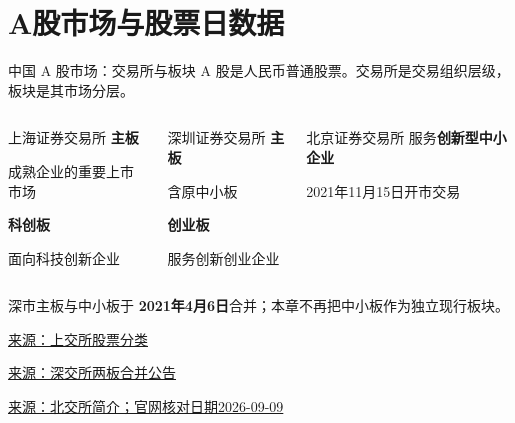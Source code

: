 \documentclass[9pt]{ctexbeamer}
\newcommand{\sourcehint}[2]{\par{\tiny\color{shugray}\href{#1}{来源：#2}}}
\begin{document}
\section{A股市场与股票日数据}
\begin{frame}{中国 A 股市场：交易所与板块}
  A 股是人民币普通股票。交易所是交易组织层级，板块是其市场分层。
  \vspace{0.4cm}
  \begin{columns}[T,totalwidth=\textwidth]
    \begin{column}{0.31\textwidth}
      \begin{block}{上海证券交易所}
        \textbf{主板}\par 成熟企业的重要上市市场\vspace{0.2cm}\par
        \textbf{科创板}\par 面向科技创新企业
      \end{block}
    \end{column}
    \begin{column}{0.31\textwidth}
      \begin{block}{深圳证券交易所}
        \textbf{主板}\par 含原中小板\vspace{0.2cm}\par
        \textbf{创业板}\par 服务创新创业企业
      \end{block}
    \end{column}
    \begin{column}{0.31\textwidth}
      \begin{block}{北京证券交易所}
        服务\textbf{创新型中小企业}\par
        2021年11月15日开市交易
      \end{block}
    \end{column}
  \end{columns}
  \vspace{0.25cm}
  深市主板与中小板于 \textbf{2021年4月6日}合并；本章不再把中小板作为独立现行板块。
  \sourcehint{https://star.sse.com.cn/assortment/stock/list/share/}{上交所股票分类}
  \sourcehint{https://www.szse.cn/aboutus/trends/news/t20210406_585442.html}{深交所两板合并公告}
  \sourcehint{https://www.bse.cn/company/introduce.html}{北交所简介；官网核对日期2026-09-09}
\end{frame}
\end{document}
